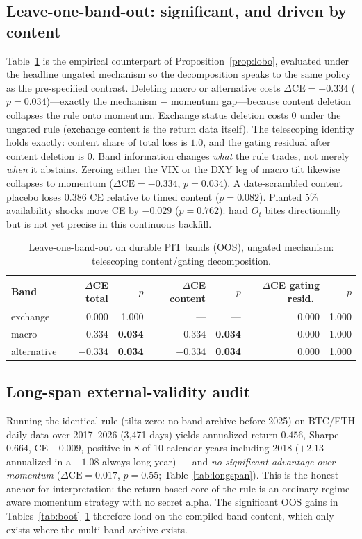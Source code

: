 \documentclass[12pt]{article}
\begin{document}
\subsection{Leave-one-band-out: significant, and driven by content}
Table~\ref{tab:lobo} is the empirical counterpart of Proposition~\ref{prop:lobo}, evaluated under the headline ungated mechanism so the decomposition speaks to the same policy as the pre-specified contrast. Deleting macro or alternative costs $\Delta\mathrm{CE}=-0.334$ ($p=0.034$)---exactly the mechanism $-$ momentum gap---because content deletion collapses the rule onto momentum. Exchange status deletion costs $0$ under the ungated rule (exchange content is the return data itself). The telescoping identity holds exactly: content share of total loss is $1.0$, and the gating residual after content deletion is $0$. Band information changes \emph{what} the rule trades, not merely \emph{when} it abstains. Zeroing either the VIX or the DXY leg of $\mathrm{macro\_tilt}$ likewise collapses to momentum ($\Delta\mathrm{CE}=-0.334$, $p=0.034$). A date-scrambled content placebo loses $0.386$ CE relative to timed content ($p=0.082$). Planted 5\% availability shocks move CE by $-0.029$ ($p=0.762$): hard $O_t$ bites directionally but is not yet precise in this continuous backfill.

\begin{table}[t]
\centering
\caption{Leave-one-band-out on durable PIT bands (OOS), ungated mechanism: telescoping content/gating decomposition.}
\label{tab:lobo}
\begin{tabular}{lrrrrrr}
\toprule
Band & $\Delta$CE total & $p$ & $\Delta$CE content & $p$ & $\Delta$CE gating resid.\ & $p$ \\
\midrule
exchange & $0.000$ & 1.000 & --- & --- & $0.000$ & 1.000 \\
macro & $-0.334$ & \textbf{0.034} & $-0.334$ & \textbf{0.034} & $0.000$ & 1.000 \\
alternative & $-0.334$ & \textbf{0.034} & $-0.334$ & \textbf{0.034} & $0.000$ & 1.000 \\
\bottomrule
\end{tabular}
\end{table}

\subsection{Long-span external-validity audit}
Running the identical rule (tilts zero: no band archive before 2025) on BTC/ETH daily data over 2017--2026 (3{,}471 days) yields annualized return $0.456$, Sharpe $0.664$, CE $-0.009$, positive in 8 of 10 calendar years including 2018 ($+2.13$ annualized in a $-1.08$ always-long year) --- and \emph{no significant advantage over momentum} ($\Delta\mathrm{CE}=0.017$, $p=0.55$; Table~\ref{tab:longspan}). This is the honest anchor for interpretation: the return-based core of the rule is an ordinary regime-aware momentum strategy with no secret alpha. The significant OOS gains in Tables~\ref{tab:boot}--\ref{tab:lobo} therefore load on the compiled band content, which only exists where the multi-band archive exists.
\end{document}
